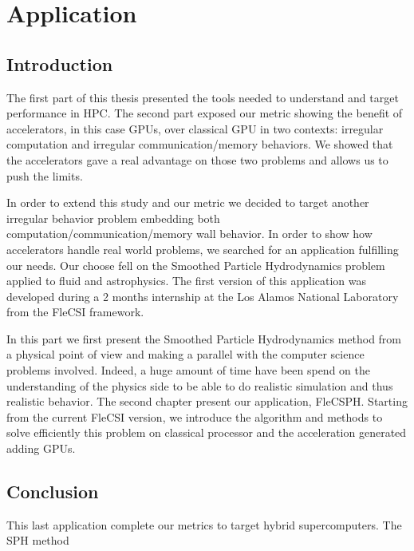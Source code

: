\part{Application}

\chapter*{Introduction}
The first part of this thesis presented the tools needed to understand and target performance in HPC. 
The second part exposed our metric showing the benefit of accelerators, in this case GPUs, over classical GPU in two contexts: irregular computation and irregular communication/memory behaviors.
We showed that the accelerators gave a real advantage on those two problems and allows us to push the limits.

In order to extend this study and our metric we decided to target another irregular behavior problem embedding both computation/communication/memory wall behavior. 
In order to show how accelerators handle real world problems, we searched for an application fulfilling our needs. 
Our choose fell on the Smoothed Particle Hydrodynamics problem applied to fluid and astrophysics. 
The first version of this application was developed during a 2 months internship at the Los Alamos National Laboratory from the FleCSI framework.

In this part we first present the Smoothed Particle Hydrodynamics method from a physical point of view and making a parallel with the computer science problems involved. 
Indeed, a huge amount of time have been spend on the understanding of the physics side to be able to do realistic simulation and thus realistic behavior. 
The second chapter present our application, FleCSPH. 
Starting from the current FleCSI version, we introduce the algorithm and methods to solve efficiently this problem on classical processor and the acceleration generated adding GPUs. 







\chapter*{Conclusion}
This last application complete our metrics to target hybrid supercomputers. 
The SPH method